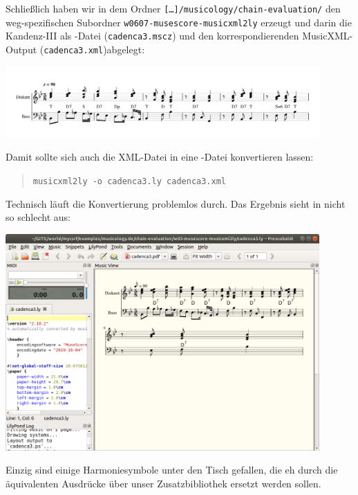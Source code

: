 Schließlich haben wir in dem Ordner
\texttt{[\ldots]/musicology/chain-evaluation/} den weg-spezifischen Subordner
\texttt{w0607-musescore-musicxml2ly} erzeugt und darin die Kandenz-III als
-Datei (\texttt{cadenca3.mscz}) und den korrespondierenden
MusicXML-Output (\texttt{cadenca3.xml})abgelegt:

\begin{center}
\includegraphics[width=0.9\textwidth]{frontends/musescore/cadenca3-musescore-300dpi.png}
\end{center}

Damit sollte sich auch die XML-Datei in eine -Datei konvertieren lassen:

\begin{quote}\texttt{musicxml2ly -o cadenca3.ly cadenca3.xml}\end{quote}

Technisch läuft die Konvertierung problemlos durch. Das Ergebnis sieht in
 nicht so schlecht aus:


\begin{center}
\includegraphics[width=0.9\textwidth]{frontends/musescore/musescore-cadenca3-in-frescobaldi.png}
\end{center}

Einzig sind einige Harmoniesymbole unter den Tisch gefallen, die eh durch die
äquivalenten Ausdrücke über unser Zusatzbibliothek  ersetzt
werden sollen.

